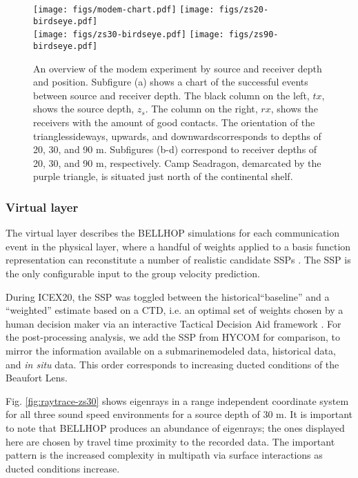 \begin{figure}[h!]
  \centering
  \texttt{[image: figs/modem-chart.pdf]} \hfill
  \texttt{[image: figs/zs20-birdseye.pdf]} \\
  \vspace{1em}
  \texttt{[image: figs/zs30-birdseye.pdf]} \hfill
  \texttt{[image: figs/zs90-birdseye.pdf]} \\
  \caption{An overview of the modem experiment by source and receiver depth and position. Subfigure (a) shows a chart of the successful events between source and receiver depth. The black column on the left, $tx$, shows the source depth, $z_s$. The column on the right, $rx$, shows the receivers with the amount of good contacts. The orientation of the triangles\textemdash sideways, upwards, and downwards\textemdash corresponds to depths of 20, 30, and 90 m. Subfigures (b-d) correspond to receiver depths of 20, 30, and 90 m, respectively. Camp Seadragon, demarcated by the purple triangle, is situated just north of the continental shelf.}
  \label{fig:overview}
  \end{figure}

\clearpage

\subsubsection{Virtual layer}
The virtual layer describes the BELLHOP simulations for each communication event in the physical layer, where a handful of weights applied to a basis function representation can reconstitute a number of realistic candidate SSPs \citep{leblanc_underwater_1980,lin_merging_2010}.
The SSP is the only configurable input to the group velocity prediction.

During ICEX20, the SSP was toggled between the historical``baseline'' and a ``weighted'' estimate based on a CTD, i.e. an optimal set of weights chosen by a human decision maker via an interactive Tactical Decision Aid framework \citep{bhatt_embedded_2021}.
For the post-processing analysis, we add the SSP from HYCOM for comparison, to mirror the information available on a submarine\textemdash modeled data, historical data, and \textit{in situ} data.
This order corresponds to increasing ducted conditions of the Beaufort Lens.

Fig. \ref{fig:raytrace-zs30} shows eigenrays in a range independent coordinate system for all three sound speed environments for a source depth of 30 m.
It is important to note that BELLHOP produces an abundance of eigenrays; the ones displayed here are chosen by travel time proximity to the recorded data.
The important pattern is the increased complexity in multipath via surface interactions as ducted conditions increase.

